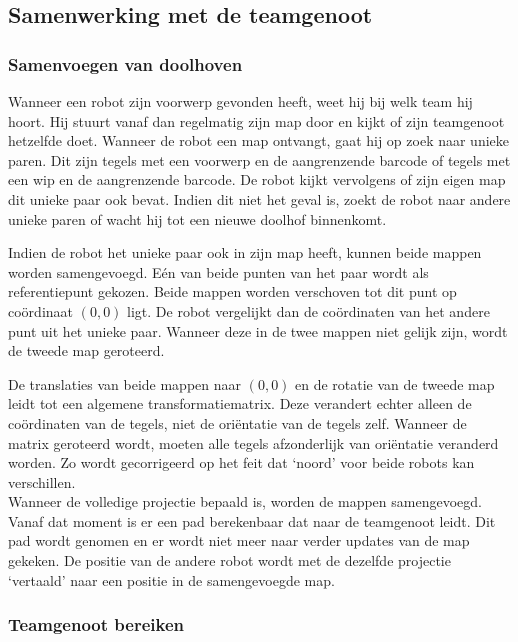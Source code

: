 \documentclass[eind]{penoverslag}
\begin{document}
\subsection{Samenwerking met de teamgenoot}
\label{ssec:AlgoSamen}

\subsubsection{Samenvoegen van doolhoven}
\label{sssec:AlgoMappen}
Wanneer een robot zijn voorwerp gevonden heeft, weet hij bij welk team hij hoort. Hij stuurt vanaf dan regelmatig zijn map door en kijkt of zijn teamgenoot hetzelfde doet.
Wanneer de robot een map ontvangt, gaat hij op zoek naar unieke paren. Dit zijn tegels met een voorwerp en de aangrenzende barcode of tegels met een wip en de aangrenzende barcode. De robot kijkt vervolgens of zijn eigen map dit unieke paar ook bevat. Indien dit niet het geval is, zoekt de robot naar andere unieke paren of wacht hij tot een nieuwe doolhof binnenkomt.

Indien de robot het unieke paar ook in zijn map heeft, kunnen beide mappen worden samengevoegd. E\'en van beide punten van het paar wordt als referentiepunt gekozen. Beide mappen worden verschoven tot dit punt op co\"ordinaat $(0,0)$ ligt. De robot vergelijkt dan de co\"ordinaten van het andere punt uit het unieke paar. Wanneer deze in de twee mappen niet gelijk zijn, wordt de tweede map geroteerd.

De translaties van beide mappen naar $(0,0)$ en de rotatie van de tweede map leidt tot een algemene transformatiematrix. Deze verandert echter alleen de co\"ordinaten van de tegels, niet de ori\"entatie van de tegels zelf. Wanneer de matrix geroteerd wordt, moeten alle tegels afzonderlijk van ori\"entatie veranderd worden. Zo wordt gecorrigeerd op het feit dat `noord' voor beide robots kan verschillen.\\

Wanneer de volledige projectie bepaald is, worden de mappen samengevoegd. Vanaf dat moment is er een pad berekenbaar dat naar de teamgenoot leidt. Dit pad wordt genomen en er wordt niet meer naar verder updates van de map gekeken. De positie van de andere robot wordt met de dezelfde projectie `vertaald' naar een positie in de samengevoegde map.

\subsubsection{Teamgenoot bereiken}
\label{sssec:AlgoTeam}
\end{document}
